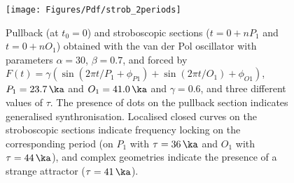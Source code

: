 \begin{figure}
\texttt{[image: Figures/Pdf/strob\_2periods]}
\caption
{
Pullback (at $t_0=0$) and stroboscopic sections ($t=0+nP_1$ and $t=0+nO_1$) obtained with the van der Pol oscillator with parameters $\alpha=30$, $\beta=0.7$, and forced by $F(t)=\gamma (\sin(2\pi t/P_1+\phi_{P1}) + \sin(2\pi t/O_1)+ \phi_{O1} )$, $P_1=23.7\,\ka$ and $O_1=41.0\,\ka$ and $\gamma=0.6$, and three different values of $\tau$. 
The presence of dots on the pullback section indicates generalised synthronisation. Localised closed curves on the stroboscopic sections indicate frequency locking on the corresponding period (on $P_1$ with $\tau=36\,\ka$  and $O_1$ with $\tau=44\,\ka$), and complex geometries indicate the presence of a strange attractor ($\tau=41\,\ka$). 
}
\label{fig:strob_2periods}
\end{figure}
